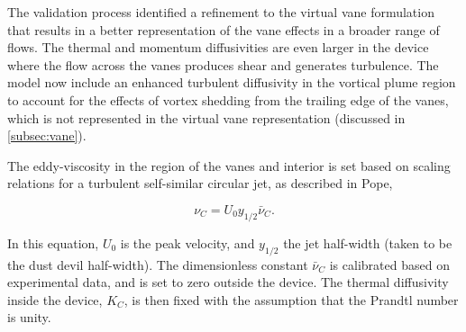 The validation process identified a refinement to the virtual vane
formulation that results in a better representation of the vane
effects in a broader range of flows. The thermal and momentum
diffusivities are even larger in the device where the flow across the
vanes produces shear and generates turbulence. The model now include an
enhanced turbulent diffusivity in the vortical plume region to account
for the effects of vortex shedding from the trailing edge of the vanes,
which is not represented in the virtual vane representation (discussed in
\ref{subsec:vane}). 


The eddy-viscosity in the region of the vanes and interior is set based
on scaling relations for a turbulent self-similar circular jet, as
described in Pope\cite{pope2000turbulent},
 
\begin{equation}
  \nu_C = U_0 y_{1/2} \bar \nu_C.
\end{equation}

In this equation, $U_0$ is the peak velocity, and $y_{1/2}$ the jet
half-width (taken to be the dust devil half-width).  
The dimensionless constant $\bar \nu_C $ is calibrated based on
experimental data, and is set to zero outside the device. 
The thermal diffusivity inside the device, $K_C$, is then fixed with the 
assumption that the Prandtl number is unity.  



